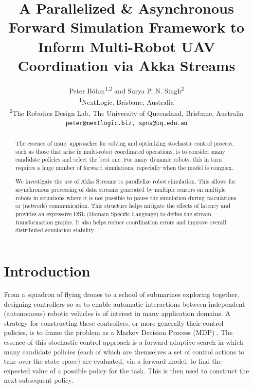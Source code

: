 \documentclass{article}
\title{A Parallelized \& Asynchronous Forward Simulation Framework to Inform Multi-Robot UAV Coordination via Akka Streams}
\author{Peter Böhm\textsuperscript{1,2} and Surya P. N. Singh\textsuperscript{2}
\\ \textsuperscript{1}NextLogic, Brisbane, Australia
\\ \textsuperscript{2}The Robotics Design Lab, The University of Queensland, Brisbane, Australia
\\ {\texttt{peter@nextlogic.biz, spns@uq.edu.au}}}
\let\cite\citep
\begin{document}
\maketitle

\begin{abstract}
The essence of many approaches for solving and optimizing stochastic control process, such as those that arise in multi-robot coordinated operations, is to consider many candidate policies and select the best one.  For many dynamic robots, this in turn requires a huge number of forward simulations, especially when the model is complex.

We investigate the use of Akka Streams to parallelize robot simulation. This allows for asynchronous processing of data streams generated by multiple sensors on multiple robots in situations where it is not possible to pause the simulation during calculations or (network) communication. 
This structure helps mitigate the effects of latency and provides an expressive DSL (Domain Specific Language) to define the stream transformation graphs.  It also helps reduce coordination errors and improve overall distributed simulation stability.  
\end{abstract}


\section{Introduction}

From a squadron of flying drones to a school of submarines exploring together, designing controllers so as to enable automatic interactions between independent (autonomous) robotic vehicles is of interest in many application domains.  A strategy for constructing these controllers, or more generally their control policies, is to frame the problem as a Markov Decision Process (MDP) \cite{howard1960dynamic}.  The essence of this stochastic control approach is a forward adaptive search in which many candidate {policies} (each of which are themselves a set of control actions to take over the state-space) are evaluated, via a forward model, to find the expected value of a possible policy for the task.  This is then used to construct the next subsequent policy.
\end{document}
